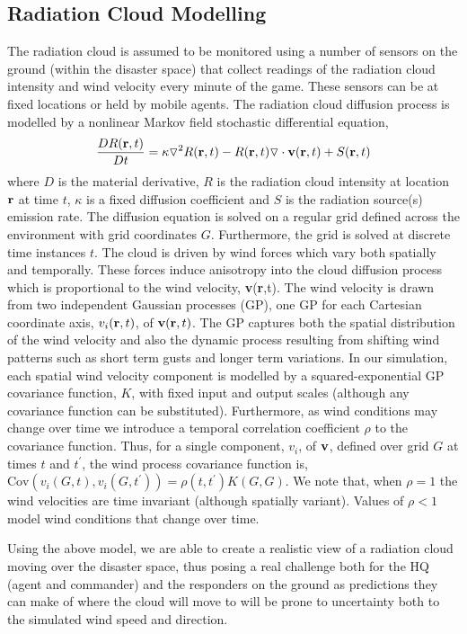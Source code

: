 \subsection{Radiation Cloud Modelling}
\noindent The radiation cloud is assumed to be monitored using a number of sensors on the ground (within the disaster space) that collect readings of the radiation cloud intensity and wind velocity every minute of the game. These sensors can be at fixed locations or held by mobile agents.  The radiation cloud diffusion process is modelled by a nonlinear Markov field stochastic differential equation,  
\begin{eqnarray*}
\frac{D R({\bf r}, t)}{D t}=\kappa \triangledown^2 R({\bf r},t)-R({\bf r},t)\triangledown \cdot {\bf v}({\bf r},t)+S({\bf r},t)
\end{eqnarray*}
where $D$ is the material derivative, $R$ is the radiation cloud intensity at location ${\bf r}$ at time $t$, $\kappa$ is a fixed diffusion coefficient and $S$ is the radiation source(s) emission rate. The diffusion equation is solved on a regular grid defined across the environment with grid coordinates $G$.  Furthermore, the grid is solved at discrete time instances $t$.  The cloud is driven by wind forces which vary both spatially and temporally.  These forces induce anisotropy into the cloud diffusion process which is proportional to the wind velocity, {\bf v}({\bf r},t).  The wind velocity is drawn from two independent Gaussian processes (GP), one GP for each Cartesian coordinate axis, $v_i({\bf r},t)$, of ${\bf v}({\bf r},t)$.  The GP captures both the spatial distribution of the wind velocity and also the dynamic process resulting from shifting wind patterns such as short term gusts and longer term variations.  In our simulation, each spatial wind velocity component is modelled by a squared-exponential GP covariance function, $K$, with fixed input and output scales (although any covariance function can be substituted). Furthermore, as wind conditions may change over time we introduce a temporal correlation coefficient $\rho$ to the covariance function.  Thus, for a single component, $v_i$, of ${\bf v}$, defined over grid $G$ at times $t$ and $t^\prime$, the wind process covariance function is, $\text{Cov}(v_i(G,t),v_i(G,t^\prime))=\rho(t,t^\prime) K(G,G)$.  We note that, when $\rho=1$ the wind velocities are time invariant (although spatially variant).  Values of $\rho<1$ model wind conditions that change over time.

Using the above model, we are able to create a realistic view of a radiation cloud moving over the disaster space, thus posing a real challenge both for the HQ (agent and commander) and the responders on the ground as predictions they can make of where the cloud will move to will be prone to uncertainty both to the simulated wind speed and direction. 


